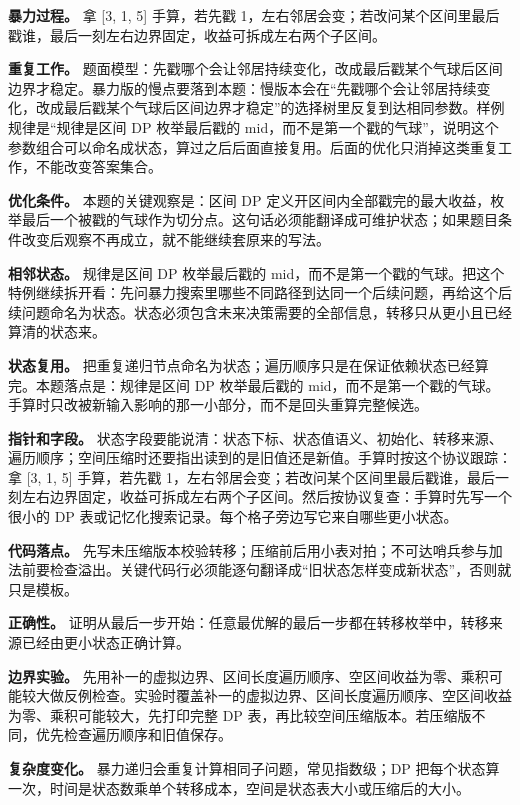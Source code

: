 \textbf{暴力过程。} 拿 [3, 1, 5] 手算，若先戳 1，左右邻居会变；若改问某个区间里最后戳谁，最后一刻左右边界固定，收益可拆成左右两个子区间。

\textbf{重复工作。} 题面模型：先戳哪个会让邻居持续变化，改成最后戳某个气球后区间边界才稳定。暴力版的慢点要落到本题：慢版本会在“先戳哪个会让邻居持续变化，改成最后戳某个气球后区间边界才稳定”的选择树里反复到达相同参数。样例规律是“规律是区间 DP 枚举最后戳的 mid，而不是第一个戳的气球”，说明这个参数组合可以命名成状态，算过之后后面直接复用。后面的优化只消掉这类重复工作，不能改变答案集合。

\textbf{优化条件。} 本题的关键观察是：区间 DP 定义开区间内全部戳完的最大收益，枚举最后一个被戳的气球作为切分点。这句话必须能翻译成可维护状态；如果题目条件改变后观察不再成立，就不能继续套原来的写法。

\textbf{相邻状态。} 规律是区间 DP 枚举最后戳的 mid，而不是第一个戳的气球。把这个特例继续拆开看：先问暴力搜索里哪些不同路径到达同一个后续问题，再给这个后续问题命名为状态。状态必须包含未来决策需要的全部信息，转移只从更小且已经算清的状态来。

\textbf{状态复用。} 把重复递归节点命名为状态；遍历顺序只是在保证依赖状态已经算完。本题落点是：规律是区间 DP 枚举最后戳的 mid，而不是第一个戳的气球。手算时只改被新输入影响的那一小部分，而不是回头重算完整候选。

\textbf{指针和字段。} 状态字段要能说清：状态下标、状态值语义、初始化、转移来源、遍历顺序；空间压缩时还要指出读到的是旧值还是新值。手算时按这个协议跟踪：拿 [3, 1, 5] 手算，若先戳 1，左右邻居会变；若改问某个区间里最后戳谁，最后一刻左右边界固定，收益可拆成左右两个子区间。然后按协议复查：手算时先写一个很小的 DP 表或记忆化搜索记录。每个格子旁边写它来自哪些更小状态。

\textbf{代码落点。} 先写未压缩版本校验转移；压缩前后用小表对拍；不可达哨兵参与加法前要检查溢出。关键代码行必须能逐句翻译成“旧状态怎样变成新状态”，否则就只是模板。

\textbf{正确性。} 证明从最后一步开始：任意最优解的最后一步都在转移枚举中，转移来源已经由更小状态正确计算。

\textbf{边界实验。} 先用补一的虚拟边界、区间长度遍历顺序、空区间收益为零、乘积可能较大做反例检查。实验时覆盖补一的虚拟边界、区间长度遍历顺序、空区间收益为零、乘积可能较大，先打印完整 DP 表，再比较空间压缩版本。若压缩版不同，优先检查遍历顺序和旧值保存。

\textbf{复杂度变化。} 暴力递归会重复计算相同子问题，常见指数级；DP 把每个状态算一次，时间是状态数乘单个转移成本，空间是状态表大小或压缩后的大小。

